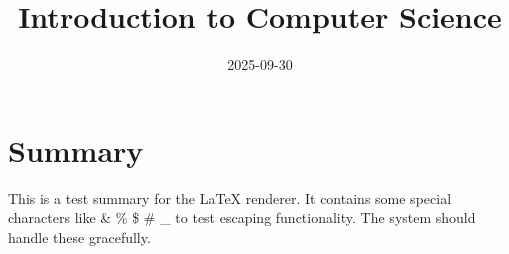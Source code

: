 \documentclass[11pt]{article}
\begin{document}
\title{Introduction to Computer Science}
\date{2025-09-30}
\maketitle

\section{Summary}
This is a test summary for the LaTeX renderer. It contains some special characters like \& \% \$ \# \_ to test escaping functionality. The system should handle these gracefully.
\end{document}
